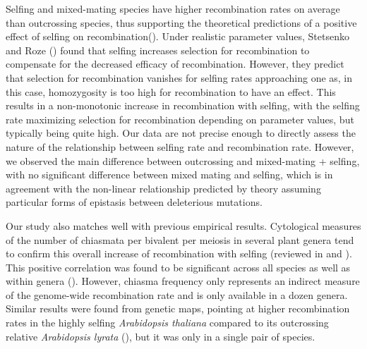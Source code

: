 \documentclass{article}
\begin{document}
Selfing and mixed-mating species have higher recombination rates on average than outcrossing species, thus supporting the theoretical predictions of a positive effect of selfing on recombination(\cite{rozeSelfFertilizationEvolutionRecombination2005,stetsenkoEvolutionRecombinationSelffertilizing2022}). Under realistic parameter values, Stetsenko and Roze (\citeyear{stetsenkoEvolutionRecombinationSelffertilizing2022}) found that selfing increases selection for recombination to compensate for the decreased efficacy of recombination. However, they predict that selection for recombination vanishes for selfing rates approaching one as, in this case, homozygosity is too high for recombination to have an effect. This results in a non-monotonic increase in recombination with selfing, with the selfing rate maximizing selection for recombination depending on parameter values, but typically being quite high. Our data are not precise enough to directly assess the nature of the relationship between selfing rate and recombination rate. However, we observed the main difference between outcrossing and mixed-mating + selfing, with no significant difference between mixed mating and selfing, which is in agreement with the non-linear relationship predicted by theory assuming particular forms of epistasis between deleterious mutations.


Our study also matches well with previous empirical results. Cytological measures of the number of chiasmata per bivalent per meiosis in several plant genera tend to confirm this overall increase of recombination with selfing (reviewed in \cite{rozeSelfFertilizationEvolutionRecombination2005} and \cite{ross-ibarraGenomeSizeRecombination2007a}). This positive correlation was found to be significant across all species as well as within genera (\cite{rozeSelfFertilizationEvolutionRecombination2005}). However, chiasma frequency only represents an indirect measure of the genome-wide recombination rate and is only available in a dozen genera. Similar results were found from genetic maps, pointing at higher recombination rates in the highly selfing \textit{Arabidopsis thaliana} compared to its outcrossing relative \textit{Arabidopsis lyrata} (\cite{hanssonComparativeGeneMapping2006a,kawabeComparativeGeneMapping2006,kuittinenComparingLinkageMaps2004}), but it was only in a single pair of species.
\end{document}
